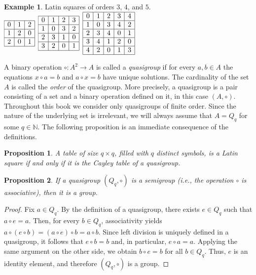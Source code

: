 \documentclass[11pt]{article}
\newtheorem{claim}{Proposition}[section]
\theoremstyle{definition}
\newtheorem{example}{Example}[section]
\begin{document}
{{{\begin{example}
Latin squares of orders $3$, $4$, and $5$.\\
 $\begin{array}{|c|c|c|}
\hline 0&1&2 \\
\hline
1&2&0 \\
 \hline
 2&0&1\\
 \hline
\end{array}$\qquad
 $\begin{array}{|c|c|c|c|}
\hline 0&1&2&3 \\
\hline
1&0&3&2 \\
 \hline
 2&3&1&0\\
\hline 3&2&0&1\\ \hline
\end{array}$\qquad
$\begin{array}{|c|c|c|c|c|}
\hline 0&1&2&3&4 \\
\hline
1&0&3&4&2 \\
 \hline
 2&3&4&0&1\\
 \hline
 3&4&1&2&0\\
\hline 4&2&0&1&3\\ \hline
\end{array}$

\end{example}

 A binary operation
 $\circ:A^2\rightarrow A$ is called a {\sl 
    quasigroup} if   for every  $a,b\in A$ the equations
    $x\circ a=b$ and $a\circ x=b$ have   unique solutions.
    The cardinality
of the set $A$ is called the {\sl order} of the quasigroup.
More precisely, a quasigroup is a pair consisting of a set and a binary operation
defined on it, in this case
$(A, \circ)$.
Throughout this book we 
consider only quasigroups of finite order.  Since the nature of
 the underlying set is irrelevant,
 we will always assume that $A=Q_q$ for some $q\in
\mathbb{N}$. The following proposition is an immediate consequence of  the definitions.

\begin{claim}
A table of size $q\times q$, filled with $q$ distinct symbols,
is a Latin square if and only if it is the Cayley table of a quasigroup.
\end{claim}

\begin{claim}
If a quasigroup $(Q_q,\circ)$ is a semigroup (i.e., the operation
$\circ$ is associative), then it is a group.
\end{claim}
\begin{proof}
Fix $a\in Q_q$. By the definition of a quasigroup, there exists $e\in
Q_q$ such that $a\circ e= a$. Then, for every $b\in Q_q$, associativity yields  $a\circ (e\circ
b)= (a\circ e)\circ b= a\circ b$. Since left division is uniquely defined in a quasigroup, it follows that 
$e\circ b=b$ and, in particular, $e\circ a=a$.
Applying the same argument on the other side, we obtain
$b\circ e=b$ for all $b\in Q_q$. Thus, $e$ is an
identity element, and therefore $(Q_q,\circ)$ is a group.
\end{proof}

}}}
\end{document}
